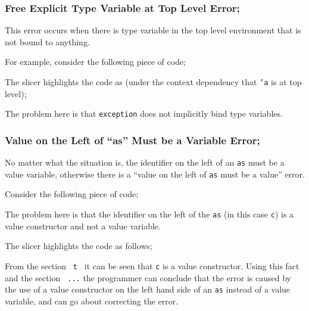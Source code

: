 \documentclass{report}
\begin{document}
\begin{itemize}

\subsubsection{Free Explicit Type Variable at Top Level Error;}

\subitem This error occurs when there is type variable in the top
level environment that is not bound to anything.


For example, consider the following piece of code;


The slicer highlights the code as (under the context dependency that
\texttt{'a} is at top level);


The problem here is that \texttt{exception} does not implicitly
bind type variables.


\vspace{0.5in}


\subsubsection{Value on the Left of ``as'' Must be a Variable Error;}

\subitem No matter what the situation is, the identifier on the left
of an \texttt{as} must be a value variable, otherwise there is
a ``value on the left of \texttt{as} must be a value'' error.

Consider the following piece of code;


The problem here is that the identifier on the left of the
\texttt{as} (in this case \texttt{c}) is a value
constructor and not a value variable.

The slicer highlights the code as follows;


From the section \texttt{ t \boxR{=} }
it can be seen that \texttt{c} is a value constructor. Using this
fact and the section \texttt{  ...} the
programmer can conclude that the error is caused by the use of a value
constructor on the left hand side of an \texttt{as} instead of
a value variable, and can go about correcting the error.


\end{itemize}
\end{document}
